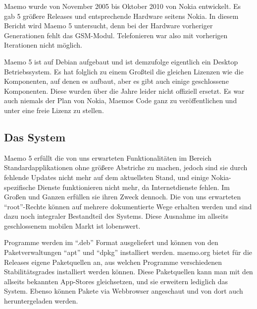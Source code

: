 Maemo wurde von November 2005\thinspace\cite{online:maemo1-770} bis Oktober 2010\thinspace\cite{online:maemo5-n900} von Nokia entwickelt. Es gab 5 größere Releases und entsprechende Hardware seitens \mbox{Nokia}\thinspace\cite{online:maemo1-770}\thinspace\cite{online:n800-specs}\thinspace\cite{online:n810-specs}\thinspace\cite{online:n900-specs}. In diesem Bericht wird Maemo 5 untersucht, denn bei der Hardware vorheriger Generationen fehlt das GSM-Modul. Telefonieren war also mit vorherigen Iterationen nicht möglich.

Maemo 5 ist auf Debian aufgebaut\thinspace\cite{online:maemo-about} und ist demzufolge eigentlich ein Desktop Betriebssystem. Es hat folglich zu einem Großteil die gleichen Lizenzen wie die Komponenten, auf denen es aufbaut, aber es gibt auch einige geschlossene Komponenten\thinspace\cite{online:maemo5-components}. Diese wurden über die Jahre leider nicht offiziell ersetzt. Es war auch niemals der Plan von Nokia, Maemos Code ganz zu veröffentlichen und unter eine freie Lizenz zu stellen\thinspace\cite{online:maemo-slides}.
\newline

\subsection{Das System}
Maemo 5 erfüllt die von uns erwarteten Funktionalitäten im Bereich Standardapplikationen ohne größere Abstriche zu machen, jedoch sind sie durch fehlende Updates nicht mehr auf dem aktuellsten Stand, und einige Nokia-spezifische Dienste funktionieren nicht mehr, da Internetdienste fehlen. Im Großen und Ganzen erfüllen sie ihren Zweck dennoch. Die von uns erwarteten ``root''-Rechte können auf mehrere dokumentierte Wege erhalten werden und sind dazu noch integraler Bestandteil des Systems\thinspace\cite{online:maemo-root}. Diese Ausnahme im allseits geschlossenem mobilen Markt ist lobenswert.

Programme werden im ``.deb'' Format ausgeliefert und können von den Paketverwaltungen ``apt'' und ``dpkg'' installiert werden\thinspace\cite{online:maemo-packetinstalling}.
\mbox{maemo.org} bietet für die Releases eigene Paketquellen an, aus welchen Programme verschiedenen Stabilitätsgrades installiert werden können\thinspace\cite{online:maemo-extras}. Diese Paketquellen kann man mit den allseits bekannten \mbox{App-Stores} gleichsetzen, und sie erweitern lediglich das System. Ebenso können Pakete via Webbrowser angeschaut und von dort auch heruntergeladen  werden\thinspace\cite{online:maemo-store}\thinspace\cite{online:maemo-rawrepos}.

